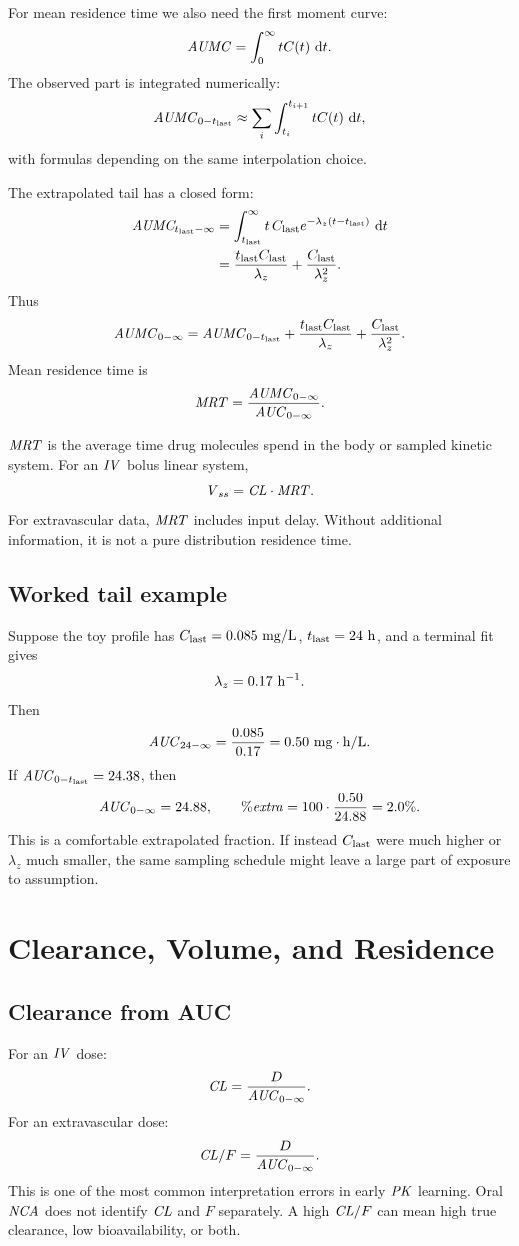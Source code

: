 \documentclass[a4paper]{article}
\newcommand{\CL}{\ensuremath{\pksym{CL}}}
\newcommand{\CLF}{\ensuremath{\pksym{CL}/F}}
\newcommand{\Vss}{\ensuremath{\pksym{V}_{ss}}}
\newcommand{\AUClast}{\ensuremath{\pksym{AUC}_{0-t_{\pklab{last}}}}}
\newcommand{\AUCinf}{\ensuremath{\pksym{AUC}_{0-\infty}}}
\newcommand{\AUMC}{\ensuremath{\pksym{AUMC}}}
\newcommand{\AUMClast}{\ensuremath{\pksym{AUMC}_{0-t_{\pklab{last}}}}}
\newcommand{\AUMCinf}{\ensuremath{\pksym{AUMC}_{0-\infty}}}
\newcommand{\MRT}{\ensuremath{\pksym{MRT}}}
\newcommand{\Clast}{\ensuremath{C_{\pklab{last}}}}
\newcommand{\Tlast}{\ensuremath{t_{\pklab{last}}}}
\newcommand{\lambdaZ}{\ensuremath{\lambda_z}}
\newcommand{\PK}{\ensuremath{\pksym{PK}}}
\newcommand{\NCA}{\ensuremath{\pksym{NCA}}}
\newcommand{\IV}{\ensuremath{\pksym{IV}}}
\begin{document}
For mean residence time we also need the first moment curve:
\[
  \AUMC=\int_0^\infty tC(t)\,\dd t.
\]
The observed part is integrated numerically:
\[
  \AUMClast \approx \sum_i \int_{t_i}^{t_{i+1}} tC(t)\,\dd t,
\]
with formulas depending on the same interpolation choice.

The extrapolated tail has a closed form:
\[
\begin{aligned}
  \pksym{AUMC}_{\Tlast-\infty}
  &=\int_{\Tlast}^{\infty} t\,\Clast e^{-\lambdaZ(t-\Tlast)}\,\dd t\\
  &=\frac{\Tlast\Clast}{\lambdaZ}+\frac{\Clast}{\lambdaZ^2}.
\end{aligned}
\]
Thus
\[
  \AUMCinf
  =
  \AUMClast
  +
  \frac{\Tlast\Clast}{\lambdaZ}
  +
  \frac{\Clast}{\lambdaZ^2}.
\]
Mean residence time is
\[
  \MRT=\frac{\AUMCinf}{\AUCinf}.
\]

\MRT{} is the average time drug molecules spend in the body or sampled kinetic system. For an \IV{} bolus linear system,
\[
  \Vss=\CL\cdot \MRT.
\]
For extravascular data, \(\MRT\) includes input delay. Without additional information, it is not a pure distribution residence time.

\subsection{Worked tail example}

Suppose the toy profile has \(\Clast=0.085\ \pklab{mg/L}\), \(\Tlast=24\ \pklab{h}\), and a terminal fit gives
\[
  \lambdaZ=0.17\ \pklab{h^{-1}}.
\]
Then
\[
  \pksym{AUC}_{24-\infty}
  =
  \frac{0.085}{0.17}
  =
  0.50\ \pklab{mg\cdot h/L}.
\]
If \(\AUClast=24.38\), then
\[
  \AUCinf=24.88,
  \qquad
  \%\pksym{extra}=100\cdot\frac{0.50}{24.88}=2.0\%.
\]
This is a comfortable extrapolated fraction. If instead \(\Clast\) were much higher or \(\lambdaZ\) much smaller, the same sampling schedule might leave a large part of exposure to assumption.

\section{Clearance, Volume, and Residence}

\subsection{Clearance from AUC}

For an \IV{} dose:
\[
  \CL=\frac{D}{\AUCinf}.
\]
For an extravascular dose:
\[
  \CLF=\frac{D}{\AUCinf}.
\]
This is one of the most common interpretation errors in early \PK{} learning. Oral \NCA{} does not identify \(\CL\) and \(F\) separately. A high \(\CLF\) can mean high true clearance, low bioavailability, or both.
\end{document}
